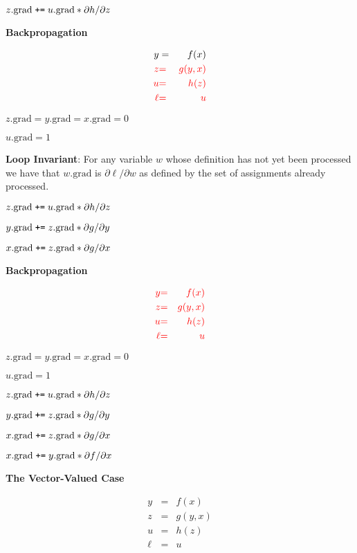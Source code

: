 \documentclass[landscape]{article}
\newcommand{\anaslide}[1]{
  \vfill
  \centerline{\Large\thepage}
  \eject \centerline{\bf #1}}
\newcommand{\anaslideplain}[1]{
  \vfill
  \eject
  \centerline{\bf #1}}
\newcommand{\pluseq}{\mbox{\tt +=}}
\newcommand{\grad}{\mathrm{grad}}
\begin{document}
{\medskip
$z.\grad\;\pluseq\; u.\grad * {\partial h}/{\partial z}$

\anaslide{Backpropagation}
\vspace{-3ex}
\begin{eqnarray*}
  y & = & f(x) \\
  {\color{red} z} & {\color{red} =} & {\color{red} g(y,x)} \\
  {\color{red} u} & {\color{red} =} & {\color{red} h(z)} \\
  {\color{red} \ell} & {\color{red} =} & {\color{red}  u}
\end{eqnarray*}

\medskip
$z.\grad = y.\grad = x.\grad = 0$

\medskip
$u.\grad = 1$

\medskip
    {\bf Loop Invariant}: For any variable $w$ whose definition has not yet been processed we have that $w.\grad$ is $\partial \ell/\partial w$ as defined by the set of assignments already processed.

\medskip
$z.\grad\;\pluseq\; u.\grad * {\partial h}/{\partial z}$

\medskip
$y.\grad \;\pluseq\; z.\grad * {\partial g}/{\partial y}$

\medskip
$x.\grad \;\pluseq\; z.\grad * {\partial g}/{\partial x}$

\anaslideplain{Backpropagation}
\vspace{-3ex}
\begin{eqnarray*}
  {\color{red} y} & {\color{red} =} & {\color{red} f(x)} \\
  {\color{red} z} & {\color{red} =} & {\color{red} g(y,x)} \\
  {\color{red} u} & {\color{red} =} & {\color{red} h(z)} \\
  {\color{red} \ell} & {\color{red} =} & {\color{red} u}
\end{eqnarray*}

\medskip
$z.\grad = y.\grad = x.\grad = 0$

\medskip
$u.\grad = 1$

\medskip
$z.\grad\;\pluseq\; u.\grad * {\partial h}/{\partial z}$

\medskip
$y.\grad \;\pluseq\; z.\grad * {\partial g}/{\partial y}$

\medskip
$x.\grad \;\pluseq\; z.\grad * {\partial g}/{\partial x}$

\medskip
$x.\grad \;\pluseq\; y.\grad * {\partial f}/{\partial x}$

\anaslide{The Vector-Valued Case}
\vspace{-3ex}
\begin{eqnarray*}
  y & = & f(x) \\
  z & = & g(y,x) \\
  u & = & h(z) \\
  \ell & = & u
\end{eqnarray*}

}
\end{document}
